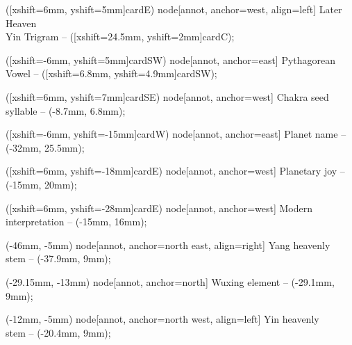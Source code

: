 \documentclass{article}
\begin{document}
\begin{center}
{  %
    ([xshift=6mm, yshift=5mm]cardE) node[annot, anchor=west, align=left] {Later Heaven\\Yin Trigram}
    -- ([xshift=24.5mm, yshift=2mm]cardC);

    ([xshift=-6mm, yshift=5mm]cardSW) node[annot, anchor=east] {Pythagorean Vowel}
    -- ([xshift=6.8mm, yshift=4.9mm]cardSW);

    ([xshift=6mm, yshift=7mm]cardSE) node[annot, anchor=west] {Chakra seed syllable}
    -- (-8.7mm, 6.8mm);

    ([xshift=-6mm, yshift=-15mm]cardW) node[annot, anchor=east] {Planet name}
    -- (-32mm, 25.5mm);

    ([xshift=6mm, yshift=-18mm]cardE) node[annot, anchor=west] {Planetary joy}
    -- (-15mm, 20mm);

    ([xshift=6mm, yshift=-28mm]cardE) node[annot, anchor=west] {Modern interpretation}
    -- (-15mm, 16mm);

    (-46mm, -5mm) node[annot, anchor=north east, align=right] {Yang heavenly\\stem}
    -- (-37.9mm, 9mm);

    (-29.15mm, -13mm) node[annot, anchor=north] {Wuxing element}
    -- (-29.1mm, 9mm);

    (-12mm, -5mm) node[annot, anchor=north west, align=left] {Yin heavenly\\stem}
    -- (-20.4mm, 9mm);
}
\end{center}

\restoregeometry
\newpage
\end{document}

